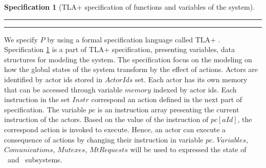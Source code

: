 \documentclass[a4paper,11pt]{article}
\theoremstyle{break}
\newtheorem{TLA}{Specification}
\begin{document}
\begin{TLA}[TLA+ specification of functions and variables of the system]
\par\noindent\rule{\textwidth}{0.4pt}
\begin{tlatex}

\end{tlatex}
\label{spe.datastructures}
\par\noindent\rule{\textwidth}{0.4pt}
\end{TLA}

We specify $P$ by using a formal specification language called TLA+ \cite{DBLP:conf/sigopsE/LamportMTY02}. Specification \ref{spe.datastructures} is a part of TLA+ specification, presenting variables, data structures for modeling the system. The specification focus on the modeling on how the global states of the system transform by the effect of actions. Actors are identified by actor ids stored in $ActorIds$ set. Each actor has its own memory that can be accessed through variable $memory$ indexed by actor ids. Each instruction in the set $Instr$ correspond an action defined in the next part of specification. The variable $pc$ is an instruction array presenting the current instruction of the actors. Based on the value of the instruction of $pc[aId]$, the correspond action is invoked to execute. Hence, an actor can execute a consequence of actions by changing their instruction in variable $pc$. $Variables$, $Comunications$, $Mutexes$, $MtRequests$ will be used to expressed the state of \Network~and \Synchronization~subsystems. 
 
\end{document}
